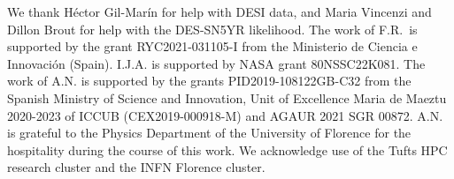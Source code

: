 \documentclass[aps,prd,twocolumn,notitlepage,
superscriptaddress,
nofootinbib,floatfix]{revtex4-2}
\begin{document}

\begin{acknowledgments}
We thank H\'ector Gil-Mar\'in  for help with DESI data, and Maria Vincenzi and Dillon Brout for help with the DES-SN5YR likelihood. The work of F.R.~is supported by the grant RYC2021-031105-I from the Ministerio de Ciencia e Innovación (Spain). I.J.A. is supported by NASA grant 80NSSC22K081. The work of A.N. is supported by the grants PID2019-108122GB-C32 from the Spanish Ministry of Science and Innovation, Unit of Excellence Maria de Maeztu 2020-2023 of ICCUB (CEX2019-000918-M) and AGAUR 2021 SGR 00872. A.N. is grateful to the Physics Department of the University of Florence for the hospitality during the course of this work.
We acknowledge use of the Tufts HPC research cluster and the INFN Florence cluster.
\end{acknowledgments}


%
\vspace{-5mm}

\end{document}
